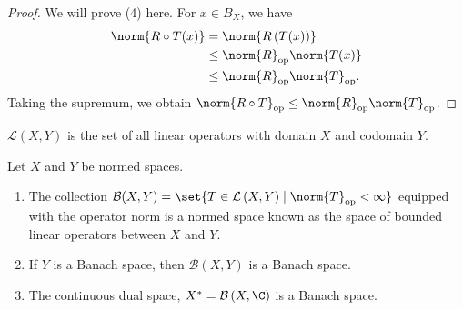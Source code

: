 \documentclass[10pt]{mypackage}
\begin{document}
\begin{proof}
  We will prove (4) here. For $x\in B_{X}$, we have
  \begin{align*}
    \norm{R\circ T(x)} &= \norm{R\left(T(x)\right)}\\
                       &\leq \norm{R}_{\text{op}}\norm{T(x)}\\
                       &\leq \norm{R}_{\text{op}}\norm{T}_{\text{op}}.
  \end{align*}
  Taking the supremum, we obtain $\norm{R\circ T}_{\text{op}}\leq \norm{R}_{\text{op}}\norm{T}_{\text{op}}$.
\end{proof}
\begin{recall}
  $\mathcal{L}(X,Y)$ is the set of all linear operators with domain $X$ and codomain $Y$.
\end{recall}
\begin{proposition}
  Let $X$ and $Y$ be normed spaces.
  \begin{enumerate}[(1)]
    \item The collection $\mathcal{B}(X,Y) = \set{T\in \mathcal{L}\left(X,Y\right)\mid \norm{T}_{\text{op}} < \infty}$ equipped with the operator norm is a normed space known as the space of bounded linear operators between $X$ and $Y$.
    \item If $Y$ is a Banach space, then $\mathcal{B}\left(X,Y\right)$ is a Banach space.
    \item The continuous dual space, $X^{\ast} = \mathcal{B}\left(X,\C\right)$ is a Banach space.
  \end{enumerate}
\end{proposition}
\end{document}
